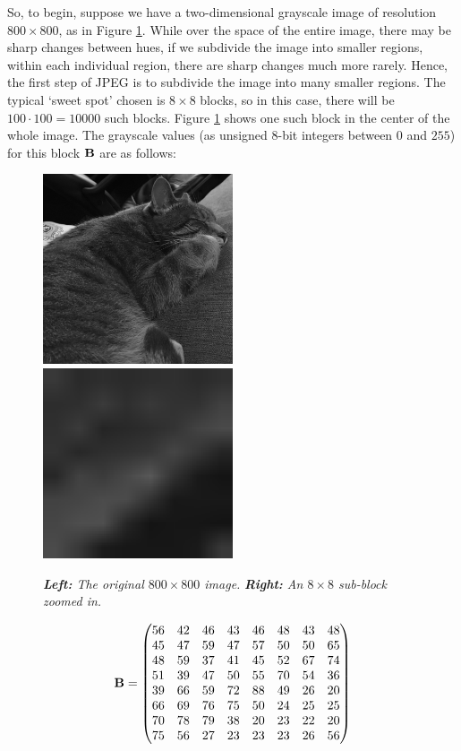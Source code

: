 So, to begin, suppose we have a two-dimensional grayscale image of resolution $800 \times 800$, as in Figure \ref{fig:charles}. While over the space of the entire image, there may be sharp changes between hues, if we subdivide the image into smaller regions, within each individual region, there are sharp changes much more rarely. Hence, the first step of JPEG is to subdivide the image into many smaller regions. The typical `sweet spot' chosen is $8 \times 8$ blocks, so in this case, there will be $100 \cdot 100 = 10000$ such blocks. Figure  \ref{fig:charles} shows one such block in the center of the whole image. The grayscale values (as unsigned $8$-bit integers between $0$ and $255$) for this block $\mathbf{B}$ are as follows:

\begin{figure}
	\includegraphics[width=0.5\textwidth]{chap4/figures/charles_gray.png}
	\includegraphics[width=0.5\textwidth]{chap4/figures/charles_block.png}
	\caption{{\em{\bf Left:} The original $800 \times 800$ image.} {\em{\bf Right:} An $8 \times 8$ sub-block zoomed in.}}
	\label{fig:charles}
\end{figure}

\begin{align}
	\mathbf{B} = \begin{pmatrix}
	56 & 42 &	46 &	43 &	46 & 48 &	43 &	48\\
	45 &	47 &	59 & 	47 &	57 &	50 &	50 &	65\\
	48 &	59 &	37 &	41 &	45 &	52 &	67 &	74\\
	51 &	39 &	47 &	50 &	55 &	70 &	54 &	36\\
	39 &	66 &	59 &	72 &	88 &	49 &	26 &	20\\
	66 &	69 &	76 &	75 &	50 &	24 &	25 &	25\\
	70 &	78 &	79 &	38 &	20 &	23 &	22 &	20\\
	75 &	56 &	27 &	23 &	23 &	23 &	26 &	56
	\end{pmatrix}
	\label{eq:subblock}
	\end{align}

